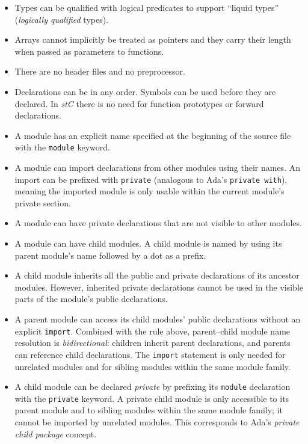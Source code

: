\documentclass[11pt,letterpaper,twoside,openany]{book}
\begin{document}
\begin{itemize}
\item Types can be qualified with logical predicates to support ``liquid types''
      (\emph{logically qualified} types).

\item Arrays cannot implicitly be treated as pointers and they carry their length when
      passed as parameters to functions.

\item There are no header files and no preprocessor.

\item Declarations can be in any order. Symbols can be used before they are declared.
      In \emph{stC} there is no need for function prototypes or forward declarations.

\item A module has an explicit name specified at the beginning of the source file with the
      \verb'module' keyword.

\item A module can import declarations from other modules using their names.
      An import can be prefixed with \verb'private' (analogous to Ada's \verb'private with'),
      meaning the imported module is only usable within the current module's private section.

\item A module can have private declarations that are not visible to other modules.

\item A module can have child modules. A child module is
      named by using its parent module's name followed by a dot as a prefix.

\item A child module inherits all the public and private declarations of its ancestor modules.
      However, inherited private declarations cannot be used in the visible parts of the module's public
      declarations.

\item A parent module can access its child modules' public declarations without an explicit
      \verb'import'.  Combined with the rule above, parent--child module name resolution is
      \emph{bidirectional}: children inherit parent declarations, and parents can reference
      child declarations.  The \verb'import' statement is only needed for unrelated modules
      and for sibling modules within the same module family.

\item A child module can be declared \emph{private} by prefixing its \verb'module' declaration with the
      \verb'private' keyword.  A private child module is only accessible to its parent module and to
      sibling modules within the same module family; it cannot be imported by unrelated modules.
      This corresponds to Ada's \emph{private child package} concept.


\end{itemize}
\end{document}
